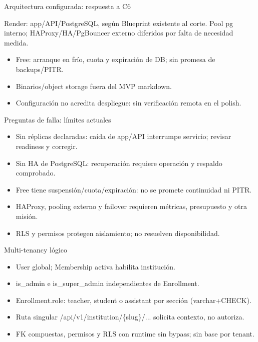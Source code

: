 \documentclass[aspectratio=169,10pt]{beamer}
\begin{document}
\begin{frame}{Arquitectura configurada: respuesta a C6}
\begin{center}
\end{center}
\small Render: app/API/PostgreSQL, según Blueprint existente al corte.
Pool pg interno; HAProxy/HA/PgBouncer externo diferidos por falta de necesidad medida.
\begin{itemize}
\item Free: arranque en frío, cuota y expiración de DB; sin promesa de backups/PITR.
\item Binarios/object storage fuera del MVP markdown.
\item Configuración no acredita despliegue: sin verificación remota en el polish.
\end{itemize}
\end{frame}
\begin{frame}{Preguntas de falla: límites actuales}
\small
\begin{itemize}
\item Sin réplicas declaradas: caída de app/API interrumpe servicio; revisar readiness y corregir.
\item Sin HA de PostgreSQL: recuperación requiere operación y respaldo comprobado.
\item Free tiene suspensión/cuota/expiración: no se promete continuidad ni PITR.
\item HAProxy, pooling externo y failover requieren métricas, presupuesto y otra misión.
\item RLS y permisos protegen aislamiento; no resuelven disponibilidad.
\end{itemize}
\end{frame}
\begin{frame}{Multi-tenancy lógico}
\begin{itemize}
\item User global; Membership activa habilita institución.
\item is\_admin e is\_super\_admin independientes de Enrollment.
\item Enrollment.role: teacher, student o assistant por sección (varchar+CHECK).
\item Ruta singular /api/v1/institution/\{slug\}/... solicita contexto, no autoriza.
\item FK compuestas, permisos y RLS con runtime sin bypass; sin base por tenant.
\end{itemize}
\end{frame}
\end{document}

